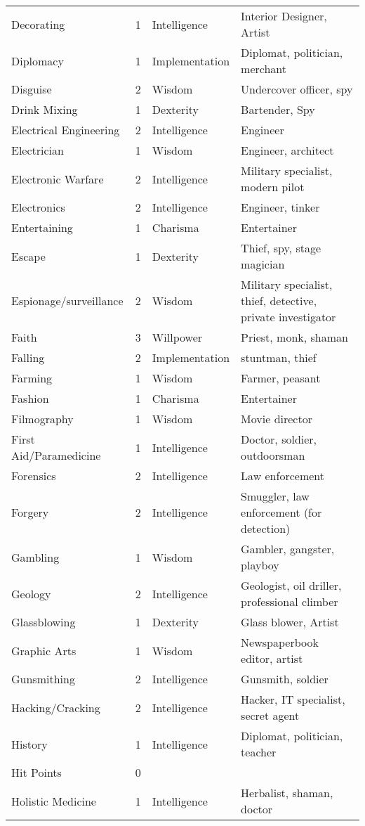 \documentclass[twoside]{book}
\begin{document}
\begin{longtable}{p{1.25in}llp{12em}}
      \raggedright Decorating & 1 & Intelligence & Interior Designer, Artist
           \tabularnewline
      \raggedright Diplomacy & 1 & Implementation & Diplomat, politician,
           merchant \tabularnewline
      \raggedright Disguise & 2 & Wisdom & Undercover officer, spy
           \tabularnewline
      \raggedright Drink Mixing & 1 & Dexterity & Bartender, Spy \tabularnewline
      \raggedright Electrical Engineering & 2 & Intelligence & Engineer \tabularnewline
      \raggedright Electrician & 1 & Wisdom & Engineer, architect
           \tabularnewline
      \raggedright Electronic Warfare & 2 & Intelligence & Military specialist,
           modern pilot \tabularnewline
      \raggedright Electronics & 2 & Intelligence & Engineer, tinker \tabularnewline
      \raggedright Entertaining & 1 & Charisma & Entertainer \tabularnewline
      \raggedright Escape & 1 & Dexterity & Thief, spy, stage
           magician \tabularnewline
      \raggedright Espionage/surveillance & 2 & Wisdom & Military specialist,
           thief, detective, private investigator \tabularnewline
      \raggedright Faith & 3 & Willpower & Priest, monk, shaman
           \tabularnewline
      \raggedright Falling & 2 & Implementation & stuntman, thief \tabularnewline
      \raggedright Farming & 1 & Wisdom & Farmer, peasant \tabularnewline
      \raggedright Fashion & 1 & Charisma & Entertainer \tabularnewline
      \raggedright Filmography & 1 & Wisdom & Movie director \tabularnewline
      \raggedright First Aid/Paramedicine & 1 & Intelligence & Doctor, soldier,
           outdoorsman \tabularnewline
      \raggedright Forensics & 2 & Intelligence & Law enforcement \tabularnewline
      \raggedright Forgery & 2 & Intelligence & Smuggler, law enforcement
           (for detection) \tabularnewline
      \raggedright Gambling & 1 & Wisdom & Gambler, gangster,
           playboy \tabularnewline
      \raggedright Geology & 2 & Intelligence & Geologist, oil driller,
           professional climber \tabularnewline
      \raggedright Glassblowing & 1 & Dexterity & Glass blower, Artist
           \tabularnewline
      \raggedright Graphic Arts & 1 & Wisdom & Newspaperbook
           editor, artist \tabularnewline
      \raggedright Gunsmithing & 2 & Intelligence & Gunsmith, soldier
           \tabularnewline
      \raggedright Hacking/Cracking & 2 & Intelligence & Hacker, IT specialist,
           secret agent \tabularnewline
      \raggedright History & 1 & Intelligence & Diplomat, politician,
           teacher \tabularnewline
      \raggedright Hit Points & 0 &\tabularnewline
      \raggedright Holistic Medicine & 1 & Intelligence & Herbalist, shaman, doctor

\end{longtable}
\end{document}
